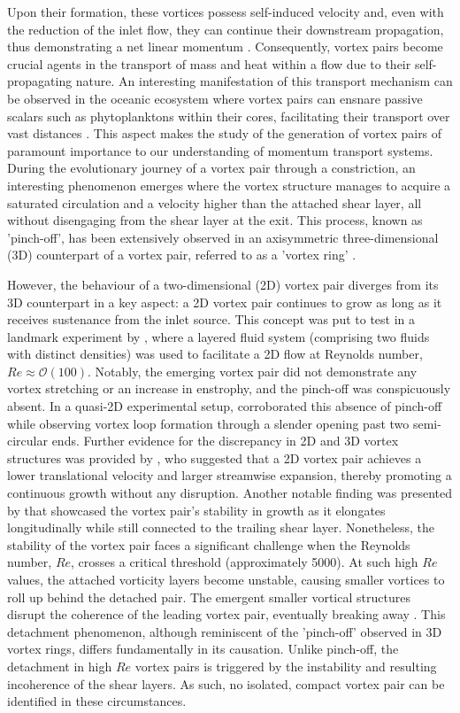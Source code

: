\documentclass[final,3p,10pt,times,review,authoryear]{elsarticle}
\begin{document}
	Upon their formation, these vortices possess self-induced velocity and, even with the reduction of the inlet flow, they can continue their downstream propagation, thus demonstrating a net linear momentum \citep{Barker1977}. Consequently, vortex pairs become crucial agents in the transport of mass and heat within a flow due to their self-propagating nature. An interesting manifestation of this transport mechanism can be observed in the oceanic ecosystem where vortex pairs can ensnare passive scalars such as phytoplanktons within their cores, facilitating their transport over vast distances \citep{Provenzale1999}. This aspect makes the study of the generation of vortex pairs of paramount importance to our understanding of momentum transport systems. During the evolutionary journey of a vortex pair through a constriction, an interesting phenomenon emerges where the vortex structure manages to acquire a saturated circulation and a velocity higher than the attached shear layer, all without disengaging from the shear layer at the exit. This process, known as 'pinch-off', has been extensively observed in an axisymmetric three-dimensional (3D) counterpart of a vortex pair, referred to as a 'vortex ring' \citep{Gharib1998}.
	
	However, the behaviour of a two-dimensional (2D) vortex pair diverges from its 3D counterpart in a key aspect: a 2D vortex pair continues to grow as long as it receives sustenance from the inlet source. This concept was put to test in a landmark experiment by \cite{Afanasyev2006}, where a layered fluid system (comprising two fluids with distinct densities) was used to facilitate a 2D flow at Reynolds number, $Re \approx\mathcal{O}(100)$. Notably, the emerging vortex pair did not demonstrate any vortex stretching or an increase in enstrophy, and the pinch-off was conspicuously absent. In a quasi-2D experimental setup, \cite{domenichini_2011} corroborated this absence of pinch-off while observing vortex loop formation through a slender opening past two semi-circular ends. Further evidence for the discrepancy in 2D and 3D vortex structures was provided by \cite{ofarrell_dabiri_2012}, who suggested that a 2D vortex pair achieves a lower translational velocity and larger streamwise expansion, thereby promoting a continuous growth without any disruption. Another notable finding was presented by \cite{pedrizzetti_2010} that showcased the vortex pair's stability in growth as it elongates longitudinally while still connected to the trailing shear layer. Nonetheless, the stability of the vortex pair faces a significant challenge when the Reynolds number, $Re$, crosses a critical threshold (approximately 5000). At such high $Re$ values, the attached vorticity layers become unstable, causing smaller vortices to roll up behind the detached pair. The emergent smaller vortical structures disrupt the coherence of the leading vortex pair, eventually breaking away \citep{luchini_tognaccini_2002}. This detachment phenomenon, although reminiscent of the 'pinch-off' observed in 3D vortex rings, differs fundamentally in its causation. Unlike pinch-off, the detachment in high $Re$ vortex pairs is triggered by the instability and resulting incoherence of the shear layers. As such, no isolated, compact vortex pair can be identified in these circumstances. 
	
\end{document}
